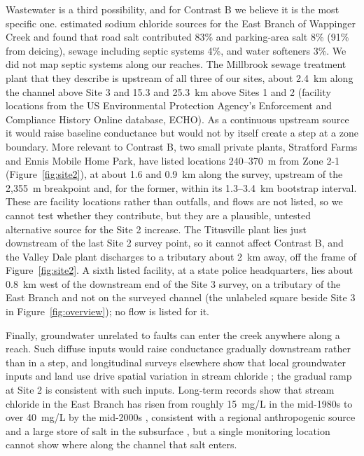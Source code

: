 \documentclass{article}
\begin{document}
Wastewater is a third possibility, and for Contrast B we believe it is the most specific one. \citet{kelly2008} estimated sodium chloride sources for the East Branch of Wappinger Creek and found that road salt contributed 83\% and parking-area salt 8\% (91\% from deicing), sewage including septic systems 4\%, and water softeners 3\%. We did not map septic systems along our reaches. The Millbrook sewage treatment plant that they describe is upstream of all three of our sites, about 2.4~km along the channel above Site 3 and 15.3 and 25.3~km above Sites 1 and 2 (facility locations from the US Environmental Protection Agency's Enforcement and Compliance History Online database, ECHO). As a continuous upstream source it would raise baseline conductance but would not by itself create a step at a zone boundary. More relevant to Contrast B, two small private plants, Stratford Farms and Ennis Mobile Home Park, have listed locations 240--370~m from Zone 2-1 (Figure~\ref{fig:site2}), at about 1.6 and 0.9~km along the survey, upstream of the 2{,}355~m breakpoint and, for the former, within its 1.3--3.4~km bootstrap interval. These are facility locations rather than outfalls, and flows are not listed, so we cannot test whether they contribute, but they are a plausible, untested alternative source for the Site 2 increase. The Titusville plant lies just downstream of the last Site 2 survey point, so it cannot affect Contrast B, and the Valley Dale plant discharges to a tributary about 2~km away, off the frame of Figure~\ref{fig:site2}. A sixth listed facility, at a state police headquarters, lies about 0.8~km west of the downstream end of the Site 3 survey, on a tributary of the East Branch and not on the surveyed channel (the unlabeled square beside Site 3 in Figure~\ref{fig:overview}); no flow is listed for it.

Finally, groundwater unrelated to faults can enter the creek anywhere along a reach. Such diffuse inputs would raise conductance gradually downstream rather than in a step, and longitudinal surveys elsewhere show that local groundwater inputs and land use drive spatial variation in stream chloride \citep{hodgins2026}; the gradual ramp at Site 2 is consistent with such inputs. Long-term records show that stream chloride in the East Branch has risen from roughly 15~mg/L in the mid-1980s to over 40~mg/L by the mid-2000s \citep{kelly2008}, consistent with a regional anthropogenic source and a large store of salt in the subsurface \citep{vanmeter2024}, but a single monitoring location cannot show where along the channel that salt enters.
\end{document}
